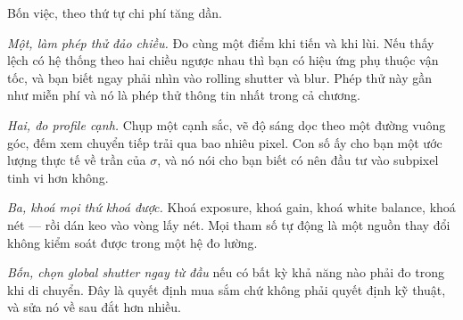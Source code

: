 \documentclass[../../marker.tex]{subfiles}
\begin{document}
Bốn việc, theo thứ tự chi phí tăng dần.

\emph{Một, làm phép thử đảo chiều.} Đo cùng một điểm khi tiến và khi lùi. Nếu thấy lệch có hệ thống theo hai chiều ngược nhau thì bạn có hiệu ứng phụ thuộc vận tốc, và bạn biết ngay phải nhìn vào rolling shutter và blur. Phép thử này gần như miễn phí và nó là phép thử thông tin nhất trong cả chương.

\emph{Hai, đo profile cạnh.} Chụp một cạnh sắc, vẽ độ sáng dọc theo một đường vuông góc, đếm xem chuyển tiếp trải qua bao nhiêu pixel. Con số ấy cho bạn một ước lượng thực tế về trần của \(\sigma\), và nó nói cho bạn biết có nên đầu tư vào subpixel tinh vi hơn không.

\emph{Ba, khoá mọi thứ khoá được.} Khoá exposure, khoá gain, khoá white balance, khoá nét --- rồi dán keo vào vòng lấy nét. Mọi tham số tự động là một nguồn thay đổi không kiểm soát được trong một hệ đo lường.

\emph{Bốn, chọn global shutter ngay từ đầu} nếu có bất kỳ khả năng nào phải đo trong khi di chuyển. Đây là quyết định mua sắm chứ không phải quyết định kỹ thuật, và sửa nó về sau đắt hơn nhiều.
\end{document}
